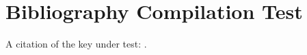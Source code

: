 \documentclass[11pt]{article}
\begin{document}
\section*{Bibliography Compilation Test}
A citation of the key under test: \cite{knuth1984}.

\nocite{*}

\printbibliography
\end{document}
